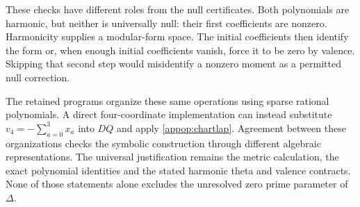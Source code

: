 These checks have different roles from the null certificates. Both polynomials are harmonic, but neither is universally null: their first coefficients are nonzero. Harmonicity supplies a modular-form space. The initial coefficients then identify the form or, when enough initial coefficients vanish, force it to be zero by valence. Skipping that second step would misidentify a nonzero moment as a permitted null correction.

The retained programs organize these same operations using sparse rational polynomials. A direct four-coordinate implementation can instead substitute $v_4=-\sum_{a=0}^3x_a$ into $DQ$ and apply \eqref{appop:chartlap}. Agreement between these organizations checks the symbolic construction through different algebraic representations. The universal justification remains the metric calculation, the exact polynomial identities and the stated harmonic theta and valence contracts. None of those statements alone excludes the unresolved zero prime parameter of $\Delta$.
